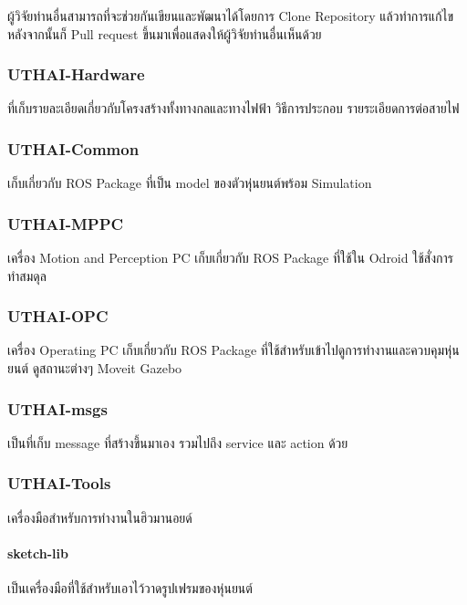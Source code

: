 ผู้วิจัยท่านอื่นสามารถที่จะช่วยกันเขียนและพัฒนาได้โดยการ Clone Repository แล้วทำการแก้ไขหลังจากนั้นก็ Pull request ขึ้นมาเพื่อแสดงให้ผู้วิจัยท่านอื่นเห็นด้วย


\clearpage
\subsubsection*{UTHAI-Hardware}
ที่เก็บรายละเอียดเกี่ยวกับโครงสร้างทั้งทางกลและทางไฟฟ้า วิธีการประกอบ รายระเอียดการต่อสายไฟ

\subsubsection*{UTHAI-Common}
เก็บเกี่ยวกับ ROS Package ที่เป็น model ของตัวหุ่นยนต์พร้อม Simulation

\subsubsection*{UTHAI-MPPC}
เครื่อง Motion and Perception PC
เก็บเกี่ยวกับ ROS Package ที่ใช้ใน Odroid ใช้สั่งการ ทำสมดุล

\subsubsection*{UTHAI-OPC}
เครื่อง Operating PC
เก็บเกี่ยวกับ ROS Package ที่ใช้สำหรับเข้าไปดูการทำงานและควบคุมหุ่นยนต์ ดูสถานะต่างๆ Moveit Gazebo

\subsubsection*{UTHAI-msgs}
เป็นที่เก็บ message ที่สร้างขึ้นมาเอง รวมไปถึง service และ action ด้วย

\clearpage
\subsubsection*{UTHAI-Tools}
เครื่องมือสำหรับการทำงานในฮิวมานอยด์

\paragraph*{sketch-lib}
เป็นเครื่องมือที่ใช้สำหรับเอาไว้วาดรูปเฟรมของหุ่นยนต์

